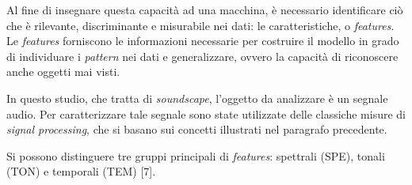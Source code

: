 Al fine di insegnare questa capacità ad una macchina, è necessario identificare ciò che è
rilevante, discriminante e misurabile nei dati: le caratteristiche, o \textit{features}. Le \textit{features}
forniscono le informazioni necessarie per costruire il modello in grado di individuare i
\textit{pattern} nei dati e generalizzare, ovvero la capacità di riconoscere anche oggetti mai visti.

In questo studio, che tratta di \textit{soundscape}, l’oggetto da analizzare è un segnale audio. Per
caratterizzare tale segnale sono state utilizzate delle classiche misure di \textit{signal processing},
che si basano sui concetti illustrati nel paragrafo precedente.

Si possono distinguere tre gruppi principali di \textit{features}: spettrali (SPE), tonali (TON) e
temporali (TEM) [7].


